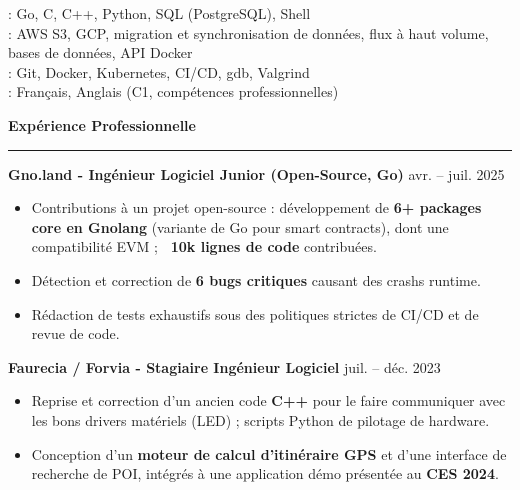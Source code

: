 \documentclass[9pt]{extarticle}
\begin{document}
\hspace*{5pt}{\bfseries Langages}: Go, C, C++, Python, SQL (PostgreSQL), Shell
\\
\hspace*{5pt}{\bfseries Stockage \& Cloud}: AWS S3, GCP, migration et synchronisation de données, flux à haut volume, bases de données, API Docker
\\
\hspace*{5pt}{\bfseries Outils}: Git, Docker, Kubernetes, CI/CD, gdb, Valgrind
\\
\hspace*{5pt}{\bfseries Langues}: Français, Anglais (C1, compétences professionnelles)

\par\vspace{5pt}

{\large\bfseries Expérience Professionnelle}
\par\vspace{-8pt}
\rule{\linewidth}{0.4pt}
\par\vspace{5pt}

{\bfseries Gno.land - Ingénieur Logiciel Junior (Open-Source, Go)} \hfill avr. -- juil. 2025
\begin{itemize}[noitemsep, topsep=0pt]
	\item Contributions à un projet open-source : développement de {\bfseries 6+ packages core en Gnolang} (variante de Go pour smart contracts), dont une compatibilité EVM ; {\bfseries ~10k lignes de code} contribuées.
	\item Détection et correction de {\bfseries 6 bugs critiques} causant des crashs runtime.
	\item Rédaction de tests exhaustifs sous des politiques strictes de CI/CD et de revue de code.
\end{itemize}

\par\vspace{5pt}

{\bfseries Faurecia / Forvia - Stagiaire Ingénieur Logiciel} \hfill juil. -- déc. 2023
\begin{itemize}[noitemsep, topsep=0pt]
	\item Reprise et correction d'un ancien code {\bfseries C++} pour le faire communiquer avec les bons drivers matériels (LED) ; scripts Python de pilotage de hardware.
	\item Conception d'un {\bfseries moteur de calcul d'itinéraire GPS} et d'une interface de recherche de POI, intégrés à une application démo présentée au {\bfseries CES 2024}.
\end{itemize}
\end{document}
